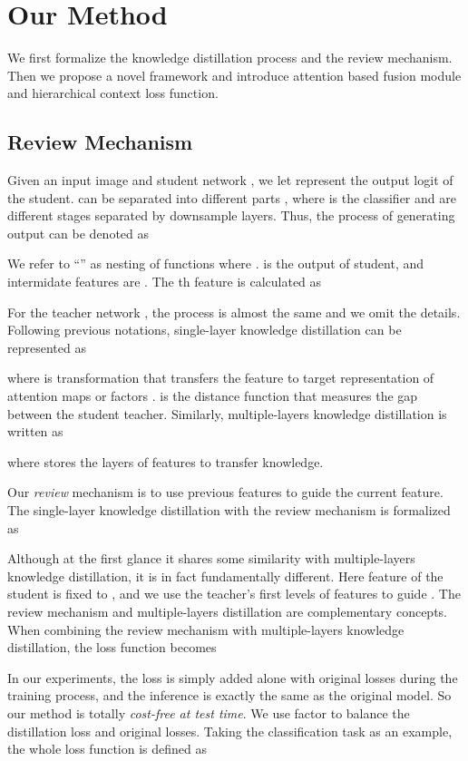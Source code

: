 \documentclass[final]{cvpr}
\begin{document}
\section{Our Method}

We first formalize the knowledge distillation process and the review mechanism. Then we propose a novel framework and introduce attention based fusion module and hierarchical context loss function.

\subsection{Review Mechanism}
\label{sec:rm}

Given an input image  and student network , we let  represent the output logit of the student.  can be separated into different parts , where  is the classifier and  are different stages separated by downsample layers. Thus, the process of generating output  can be denoted as

We refer to ``'' as nesting of functions where .  is the output of student, and intermidate features are . The th feature is calculated as

For the teacher network , the process is almost the same and we omit the details. Following previous notations, single-layer knowledge distillation can be represented as 

where  is transformation that transfers the feature to target representation of attention maps \cite{at} or factors \cite{ft}.  is the distance function that measures the gap between the student teacher. Similarly, multiple-layers knowledge distillation is written as

where  stores the layers of features to transfer knowledge.

Our {\it review} mechanism is to use previous features to guide the current feature. The single-layer knowledge distillation with the review mechanism is formalized as

Although at the first glance it shares some similarity with multiple-layers knowledge distillation, it is in fact fundamentally different. Here feature of the student is fixed to , and we use the teacher's first  levels of features to guide . The review mechanism and multiple-layers distillation are complementary concepts. When combining the review mechanism with multiple-layers knowledge distillation, the loss function becomes

In our experiments, the  loss is simply added alone with original losses during the training process, and the inference is exactly the same as the original model. So our method is totally {\it cost-free at test time}. We use factor  to balance the distillation loss and original losses. Taking the classification task as an example, the whole loss function is defined as
\end{document}
